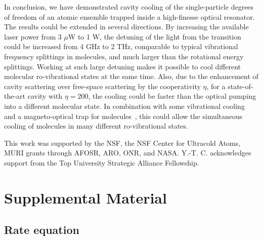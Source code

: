 \documentclass[aps,prl,superscriptaddress,onecloumn,nobibnotes]{revtex4-1}
\begin{document}
 In conclusion, we have demonstrated cavity cooling of the single-particle degrees of freedom of an atomic ensemble trapped inside a high-finesse optical resonator. The results could be extended in several directions. By increasing the available laser power from 3 $\mu$W to 1 W, the detuning of the light from the transition could be increased from 4 GHz to 2 THz, comparable to typical vibrational frequency splittings in molecules, and much larger than the rotational energy splittings. Working at such large detuning makes it possible to cool different molecular ro-vibrational states at the same time. Also, due to the enhancement of cavity scattering over free-space scattering by the cooperativity $\eta$, for a state-of-the-art cavity with $\eta=200$, the cooling could be faster than the optical pumping into a different molecular state. In combination with some vibrational cooling~\cite{viteau2008optical} and a magneto-optical trap for molecules~\cite{barry2014magneto}, this could allow the simultaneous cooling of molecules in many different ro-vibrational states.\par

 
\begin{acknowledgments}
This work was supported by the NSF, the NSF Center for Ultracold Atoms, MURI grants through AFOSR, ARO, ONR, and NASA.  Y.-T. C. acknowledges support from the Top University Strategic Alliance Fellowship.
\end{acknowledgments}
\clearpage



\pagebreak
\widetext

\setcounter{equation}{0}
\setcounter{figure}{0}
\setcounter{table}{0}

\makeatletter
\renewcommand{\theequation}{S\arabic{equation}}
\renewcommand{\thefigure}{S\arabic{figure}}


\section*{Supplemental Material}

\subsection*{Rate equation} 
\end{document}
